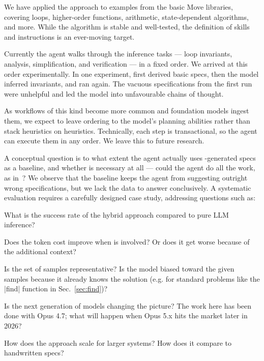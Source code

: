 \label{sec:conclusion}


We have applied the approach to examples from the basic Move libraries, covering loops, higher-order functions, arithmetic, state-dependent algorithms, and more.
While the \WP algorithm is stable and well-tested, the definition of skills and instructions is an ever-moving target.

Currently the agent walks through the inference tasks --- loop invariants, \WP analysis, simplification, and verification --- in a fixed order.
We arrived at this order experimentally. In one experiment, \WP first derived basic specs, then the model inferred invariants, and \WP ran again.
The vacuous specifications from the first run were unhelpful and led the model into unfavourable chains of thought.

As workflows of this kind become more common and foundation models ingest them, we expect to leave ordering to the model's planning abilities rather than stack heuristics on heuristics.
Technically, each step is transactional, so the agent can execute them in any order. We leave this to future research.

A conceptual question is to what extent the agent actually uses \WP-generated specs as a baseline, and whether \WP is necessary at all --- could the agent do all the work, as in~\cite{PeiEtAl23, KamathEtAl23, MSG25}?
We observe that the \WP baseline keeps the agent from suggesting outright wrong specifications, but we lack the data to answer conclusively.
A systematic evaluation requires a carefully designed case study, addressing questions such as:
\begin{Itemize}
\item What is the success rate of the hybrid approach compared to pure LLM inference?
\item Does the token cost improve when \WP is involved? Or does it get worse because of the additional context?
\item Is the set of samples representative? Is the model biased toward the given samples because it already knows the solution (e.g. for standard problems like the |find| function in Sec.~\ref{sec:find})?
\item Is the next generation of models changing the picture? The work here has been done with Opus 4.7; what will happen when Opus 5.x hits the market later in 2026?
\item How does the approach scale for larger systems? How does it compare to handwritten specs?
\end{Itemize}

